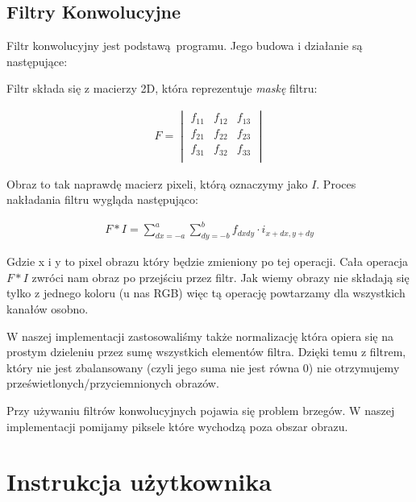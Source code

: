 \documentclass{article}
\begin{document}
\subsection{Filtry Konwolucyjne}
Filtr konwolucyjny jest podstawą programu. Jego budowa i działanie są następujące:

Filtr składa się z macierzy 2D, która reprezentuje \textit{maskę} filtru:

\begin{gather}
    F = 
       \begin{vmatrix}
        f_{11} & f_{12} & f_{13}\\
        f_{21} & f_{22} & f_{23}\\
        f_{31} & f_{32} & f_{33}\\
        \end{vmatrix}
\end{gather}

Obraz to tak naprawdę macierz pixeli, którą oznaczymy jako $I$.
Proces nakładania filtru wygląda następująco:

\begin{gather}
    F * I = \sum_{dx = -a}^{a} \sum_{dy = -b}^{b} f_{dxdy} \cdot i_{x+dx, y+dy}
\end{gather}

Gdzie x i y to pixel obrazu który będzie zmieniony po tej operacji. Cała operacja $F*I$ 
zwróci nam obraz po przejściu przez filtr. Jak wiemy obrazy nie składają się tylko 
z jednego koloru (u nas RGB) więc tą operację powtarzamy dla wszystkich kanałów osobno.

W naszej implementacji zastosowaliśmy także normalizację która opiera się na prostym dzieleniu
przez sumę wszystkich elementów filtra. Dzięki temu z filtrem, który nie jest zbalansowany (czyli jego suma
nie jest równa 0) nie otrzymujemy prześwietlonych/przyciemnionych obrazów.

Przy używaniu filtrów konwolucyjnych pojawia się problem brzegów. W naszej implementacji pomijamy
piksele które wychodzą poza obszar obrazu.









\section{Instrukcja użytkownika}
\end{document}
